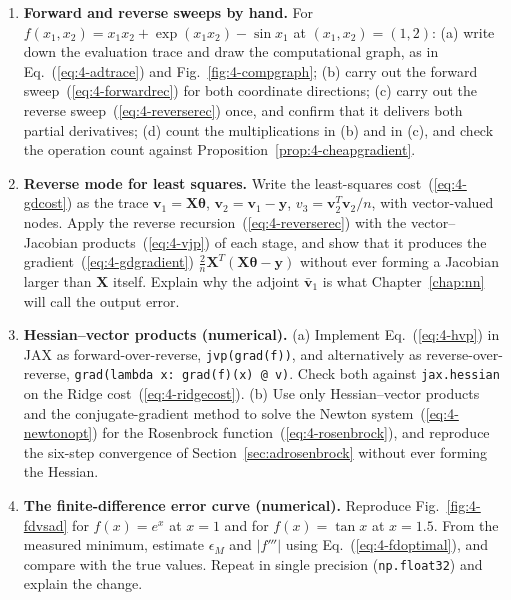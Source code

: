 \begin{enumerate}
\item \textbf{Forward and reverse sweeps by hand.}
  For $f(x_1,x_2)=x_1x_2+\exp(x_1x_2)-\sin x_1$ at $(x_1,x_2)=(1,2)$:
  (a) write down the evaluation trace and draw the computational graph, as
      in Eq.~(\ref{eq:4-adtrace}) and Fig.~\ref{fig:4-compgraph};
  (b) carry out the forward sweep~(\ref{eq:4-forwardrec}) for both
      coordinate directions;
  (c) carry out the reverse sweep~(\ref{eq:4-reverserec}) once, and confirm
      that it delivers both partial derivatives;
  (d) count the multiplications in (b) and in (c), and check the operation
      count against Proposition~\ref{prop:4-cheapgradient}.

\item \textbf{Reverse mode for least squares.}
  Write the least-squares cost~(\ref{eq:4-gdcost}) as the trace
  $\bm{v}_1=\bm{X}\bm{\theta}$, $\bm{v}_2=\bm{v}_1-\bm{y}$,
  $v_3=\bm{v}_2^{T}\bm{v}_2/n$, with vector-valued nodes.  Apply the reverse
  recursion~(\ref{eq:4-reverserec}) with the vector--Jacobian
  products~(\ref{eq:4-vjp}) of each stage, and show that it produces the
  gradient~(\ref{eq:4-gdgradient}) $\frac{2}{n}\bm{X}^{T}(\bm{X}\bm{\theta}-\bm{y})$
  without ever forming a Jacobian larger than $\bm{X}$ itself.  Explain why
  the adjoint $\bar{\bm{v}}_1$ is what Chapter~\ref{chap:nn} will call the
  output error.

\item \textbf{Hessian--vector products (numerical).}
  (a) Implement Eq.~(\ref{eq:4-hvp}) in JAX as forward-over-reverse,
      \texttt{jvp(grad(f))}, and alternatively as reverse-over-reverse,
      \texttt{grad(lambda x: grad(f)(x) @ v)}.  Check both against \texttt{jax.hessian}
      on the Ridge cost~(\ref{eq:4-ridgecost}).
  (b) Use only Hessian--vector products and the conjugate-gradient method to
      solve the Newton system~(\ref{eq:4-newtonopt}) for the Rosenbrock
      function~(\ref{eq:4-rosenbrock}), and reproduce the six-step
      convergence of Section~\ref{sec:adrosenbrock} without ever forming
      the Hessian.

\item \textbf{The finite-difference error curve (numerical).}
  Reproduce Fig.~\ref{fig:4-fdvsad} for $f(x)=e^{x}$ at $x=1$ and for
  $f(x)=\tan x$ at $x=1.5$.  From the measured minimum, estimate $\epsilon_M$
  and $|f'''|$ using Eq.~(\ref{eq:4-fdoptimal}), and compare with the true
  values.  Repeat in single precision (\texttt{np.float32}) and explain the
  change.

\end{enumerate}

